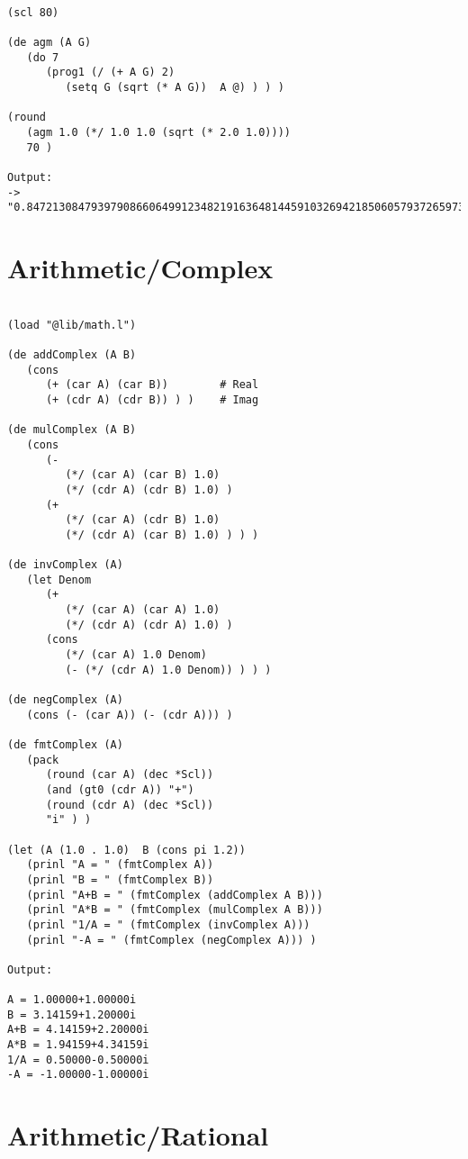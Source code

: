 \begin{verbatim}

(scl 80)

(de agm (A G)
   (do 7
      (prog1 (/ (+ A G) 2)
         (setq G (sqrt (* A G))  A @) ) ) )

(round
   (agm 1.0 (*/ 1.0 1.0 (sqrt (* 2.0 1.0))))
   70 )

Output:
-> "0.8472130847939790866064991234821916364814459103269421850605793726597340"

\end{verbatim}

\section*{Arithmetic/Complex}

\begin{verbatim}

(load "@lib/math.l")

(de addComplex (A B)
   (cons
      (+ (car A) (car B))        # Real
      (+ (cdr A) (cdr B)) ) )    # Imag

(de mulComplex (A B)
   (cons
      (-
         (*/ (car A) (car B) 1.0)
         (*/ (cdr A) (cdr B) 1.0) )
      (+
         (*/ (car A) (cdr B) 1.0)
         (*/ (cdr A) (car B) 1.0) ) ) )

(de invComplex (A)
   (let Denom
      (+
         (*/ (car A) (car A) 1.0)
         (*/ (cdr A) (cdr A) 1.0) )
      (cons
         (*/ (car A) 1.0 Denom)
         (- (*/ (cdr A) 1.0 Denom)) ) ) )

(de negComplex (A)
   (cons (- (car A)) (- (cdr A))) )

(de fmtComplex (A)
   (pack
      (round (car A) (dec *Scl))
      (and (gt0 (cdr A)) "+")
      (round (cdr A) (dec *Scl))
      "i" ) )

(let (A (1.0 . 1.0)  B (cons pi 1.2))
   (prinl "A = " (fmtComplex A))
   (prinl "B = " (fmtComplex B))
   (prinl "A+B = " (fmtComplex (addComplex A B)))
   (prinl "A*B = " (fmtComplex (mulComplex A B)))
   (prinl "1/A = " (fmtComplex (invComplex A)))
   (prinl "-A = " (fmtComplex (negComplex A))) )

Output:

A = 1.00000+1.00000i
B = 3.14159+1.20000i
A+B = 4.14159+2.20000i
A*B = 1.94159+4.34159i
1/A = 0.50000-0.50000i
-A = -1.00000-1.00000i

\end{verbatim}

\section*{Arithmetic/Rational}

